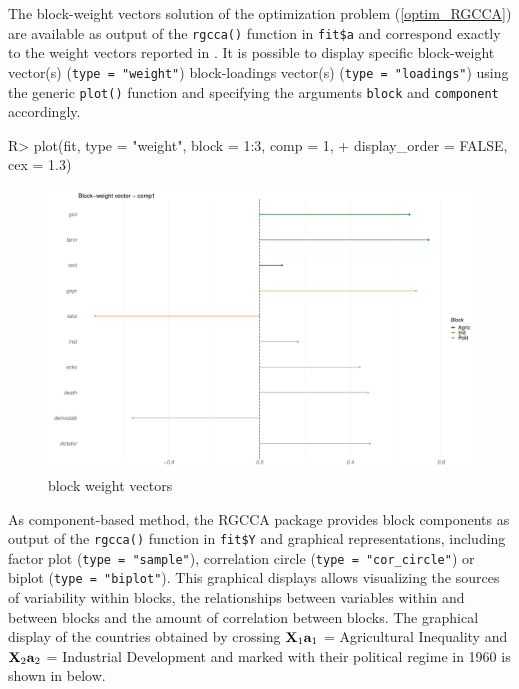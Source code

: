 \documentclass[
]{jss}
\begin{document}
\normalsize

The block-weight vectors solution of the optimization problem
(\ref{optim_RGCCA}) are available as output of the \texttt{rgcca()}
function in \texttt{fit\$a} and correspond exactly to the weight vectors
reported in \citep[see Figure 5]{Tenenhaus2011}. It is possible to
display specific block-weight vector(s) (\texttt{type\ =\ "weight"})
block-loadings vector(s) (\texttt{type\ =\ "loadings"}) using the
generic \texttt{plot()} function and specifying the arguments
\texttt{block} and \texttt{component} accordingly.

\footnotesize

\begin{CodeChunk}
\begin{CodeInput}
R> plot(fit, type = "weight", block = 1:3, comp = 1, 
+      display_order = FALSE, cex = 1.3)
\end{CodeInput}
\begin{figure}[H]

{\centering \includegraphics{RGCCA_vignette_files/figure-latex/unnamed-chunk-7-1} 

}

\caption[block weight vectors]{block weight vectors}\label{fig:unnamed-chunk-7}
\end{figure}
\end{CodeChunk}

\normalsize

As component-based method, the RGCCA package provides block components
as output of the \texttt{rgcca()} function in \texttt{fit\$Y} and
graphical representations, including factor plot
(\texttt{type\ =\ "sample"}), correlation circle
(\texttt{type\ =\ "cor\_circle"}) or biplot
(\texttt{type\ =\ "biplot"}). This graphical displays allows visualizing
the sources of variability within blocks, the relationships between
variables within and between blocks and the amount of correlation
between blocks. The graphical display of the countries obtained by
crossing \(\mathbf{X}_1 \mathbf{a}_1\) = Agricultural Inequality and \(\mathbf{X}_2 \mathbf{a}_2\)
= Industrial Development and marked with their political regime in 1960
is shown in below.
\end{document}

